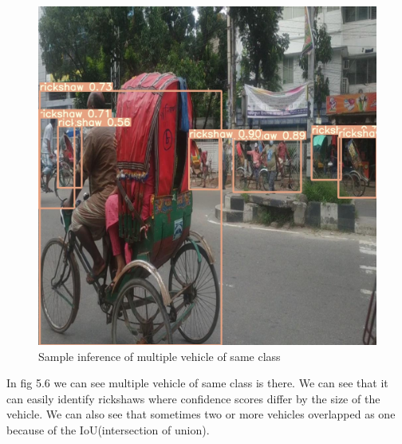 \begin{figure}[h]
    \centering
    \includegraphics[max width=\textwidth]{images/ours/inference-2.jpg}
   \caption{ Sample inference of multiple vehicle of same class}
    \label{fig:inference43}
\end{figure}

In fig 5.6 we can see multiple vehicle of same class is there. We can see that it can easily identify rickshaws where confidence scores differ by the size of the vehicle. We can also see that sometimes two or more vehicles overlapped as one because of the IoU(intersection of union).

\newpage

